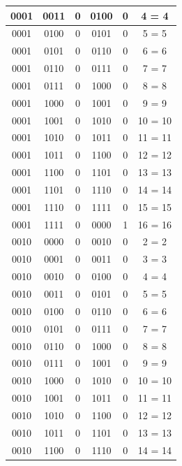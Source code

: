 \documentclass{exam}
\begin{document}
\begin{center}
\begin{longtable}{|c|c|c|c|c|c|}
                0001 & 0011 & 0 & 0100 & 0 & 4 = 4 \\ \hline
                0001 & 0100 & 0 & 0101 & 0 & 5 = 5 \\ \hline
                0001 & 0101 & 0 & 0110 & 0 & 6 = 6 \\ \hline
                0001 & 0110 & 0 & 0111 & 0 & 7 = 7 \\ \hline
                0001 & 0111 & 0 & 1000 & 0 & 8 = 8 \\ \hline
                0001 & 1000 & 0 & 1001 & 0 & 9 = 9 \\ \hline
                0001 & 1001 & 0 & 1010 & 0 & 10 = 10 \\ \hline
                0001 & 1010 & 0 & 1011 & 0 & 11 = 11 \\ \hline
                0001 & 1011 & 0 & 1100 & 0 & 12 = 12 \\ \hline
                0001 & 1100 & 0 & 1101 & 0 & 13 = 13 \\ \hline
                0001 & 1101 & 0 & 1110 & 0 & 14 = 14 \\ \hline
                0001 & 1110 & 0 & 1111 & 0 & 15 = 15 \\ \hline
                0001 & 1111 & 0 & 0000 & 1 & 16 = 16 \\ \hline
                0010 & 0000 & 0 & 0010 & 0 & 2 = 2 \\ \hline
                0010 & 0001 & 0 & 0011 & 0 & 3 = 3 \\ \hline
                0010 & 0010 & 0 & 0100 & 0 & 4 = 4 \\ \hline
                0010 & 0011 & 0 & 0101 & 0 & 5 = 5 \\ \hline
                0010 & 0100 & 0 & 0110 & 0 & 6 = 6 \\ \hline
                0010 & 0101 & 0 & 0111 & 0 & 7 = 7 \\ \hline
                0010 & 0110 & 0 & 1000 & 0 & 8 = 8 \\ \hline
                0010 & 0111 & 0 & 1001 & 0 & 9 = 9 \\ \hline
                0010 & 1000 & 0 & 1010 & 0 & 10 = 10 \\ \hline
                0010 & 1001 & 0 & 1011 & 0 & 11 = 11 \\ \hline
                0010 & 1010 & 0 & 1100 & 0 & 12 = 12 \\ \hline
                0010 & 1011 & 0 & 1101 & 0 & 13 = 13 \\ \hline
                0010 & 1100 & 0 & 1110 & 0 & 14 = 14 \\ \hline

\end{longtable}
\end{center}
\end{document}
